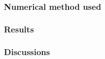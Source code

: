 \documentclass[12pt]{article}
\begin{document}
\subsubsection{Numerical method used}

\subsubsection{Results}



\subsubsection{Discussions}

\end{document}
